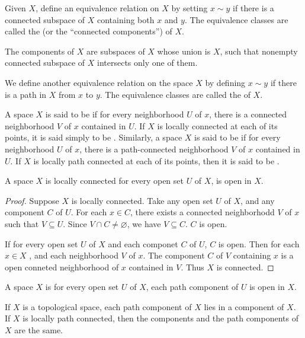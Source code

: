 \documentclass[../main.tex]{subfiles}
\begin{document}
\begin{definition}{}{}
Given $X$, define an equivalence relation on $X$ by setting $x \sim y$ if there is a connected subspace of $X$ containing both $x$ and $y$. The equivalence classes are called the  (or the ``connected components'') of $X$.
\end{definition}
\begin{theorem}{}{}
The components of $X$ are  subspaces of $X$ whose union is $X$, such that  nonempty connected subspace of $X$ intersects only one of them.
\end{theorem}
\begin{definition}{}{}
We define another equivalence relation on the space $X$ by defining $x \sim y$ if there is a path in $X$ from $x$ to $y$. The equivalence classes are called the  of $X$.
\end{definition}
\begin{definition}{}{}
A space $X$ is said to be  if for every neighborhood $U$ of $x$, there is a connected neighborhood $V$ of $x$ contained in $U$. If $X$ is locally connected at each of its points, it is said simply to be . Similarly, a space $X$ is said to be  if for every neighborhood $U$ of $x$, there is a path-connected neighborhood $V$ of $x$ contained in $U$. If $X$ is locally path connected at each of its points, then it is said to be .
\end{definition}


\begin{theorem}{}{}
A space $X$ is locally connected  for every open set $U$ of $X$,  is open in $X$.
\end{theorem}
\begin{proof}
    Suppose \(  X  \) is locally connected. Take any open set \(  U  \) of \(  X  \), and any component \(  C  \) of \(  U  \). For each \(  x \in C  \), there exists a connected neighborhodd \(  V  \) of \(  x \) such that \(  V\subseteq U  \). Since \(  V\cap C\neq \varnothing  \),     we have      \(  V\subseteq C  \). \(  C  \) is open.
    
    If for every open set \(  U  \) of \(  X  \) and each componet \(  C  \) of \(  U  \), \(  C  \) is open. Then for each \(  x \in X  \) , and each neighborhood \(  V  \) of \(  x  \). The component \(  C  \) of \(  V  \) containing \(  x  \) is a open conneted neighborhood of \(  x  \) contained in \(  V  \). Thus \(  X  \) is connected.         
\end{proof}
\begin{theorem}{}{}
A space $X$ is   for every open set $U$ of $X$, each path component of $U$ is open in $X$.
\end{theorem}
\begin{theorem}{}{}
If $X$ is a topological space, each path component of $X$ lies in a component of $X$. If $X$ is locally path connected, then the components and the path components of $X$ are the same.
\end{theorem}
\end{document}
